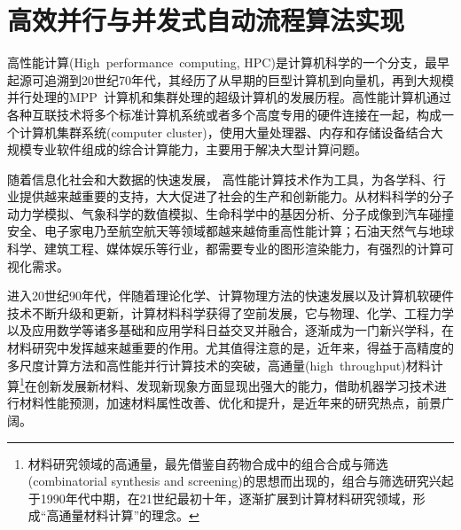 \section{高效并行与并发式自动流程算法实现} \label{chap:parallel_Concurrent}
高性能计算(\textrm{High~performance~computing, HPC})是计算机科学的一个分支，最早起源可追溯到20世纪70年代，其经历了从早期的巨型计算机到向量机，再到大规模并行处理的\textrm{MPP}~计算机和集群处理的超级计算机的发展历程。高性能计算机通过各种互联技术将多个标准计算机系统或者多个高度专用的硬件连接在一起，构成一个计算机集群系统(\textrm{computer cluster})，使用大量处理器、内存和存储设备结合大规模专业软件组成的综合计算能力，主要用于解决大型计算问题。

随着信息化社会和大数据的快速发展，%
高性能计算技术作为工具，为各学科、行业提供越来越重要的支持，大大促进了社会的生产和创新能力。从材料科学的分子动力学模拟、气象科学的数值模拟、生命科学中的基因分析、分子成像到汽车碰撞安全、电子家电乃至航空航天等领域都越来越倚重高性能计算；石油天然气与地球科学、建筑工程、媒体娱乐等行业，都需要专业的图形渲染能力，有强烈的计算可视化需求。


进入20世纪90年代，伴随着理论化学、计算物理方法的快速发展以及计算机软硬件技术不断升级和更新，计算材料科学获得了空前发展，它与物理、化学、工程力学以及应用数学等诸多基础和应用学科日益交叉并融合，逐渐成为一门新兴学科，在材料研究中发挥越来越重要的作用。尤其值得注意的是，近年来，得益于高精度的多尺度计算方法和高性能并行计算技术的突破，高通量(\textrm{high~throughput})材料计算\footnote{材料研究领域的高通量，最先借鉴自药物合成中的组合合成与筛选\textrm{(combinatorial synthesis and screening)}的思想而出现的，组合与筛选研究兴起于1990年代中期，在21世纪最初十年，逐渐扩展到计算材料研究领域，形成“高通量材料计算”的理念。}在创新发展新材料、发现新现象方面显现出强大的能力，借助机器学习技术进行材料性能预测，加速材料属性改善、优化和提升，是近年来的研究热点，前景广阔。

